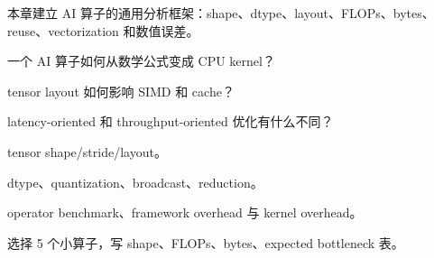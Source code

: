 {本章建立 AI 算子的通用分析框架：shape、dtype、layout、FLOPs、bytes、reuse、vectorization 和数值误差。}
{\item 一个 AI 算子如何从数学公式变成 CPU kernel？
\item tensor layout 如何影响 SIMD 和 cache？
\item latency-oriented 和 throughput-oriented 优化有什么不同？}
{\item tensor shape/stride/layout。
\item dtype、quantization、broadcast、reduction。
\item operator benchmark、framework overhead 与 kernel overhead。}
{选择 5 个小算子，写 shape、FLOPs、bytes、expected bottleneck 表。}
